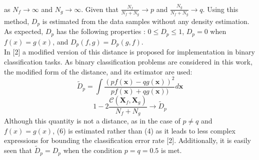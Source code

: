 \documentclass{article}
\begin{document}
	as $N_f \rightarrow \infty$ and $N_g \rightarrow \infty$. Given that $\frac{N_f}{N_f+N_g} \rightarrow p$ and $\frac{N_g}{N_f+N_g} \rightarrow q$. Using this method, $D_p$ is estimated from the data samples without any density estimation. As expected, $D_p$ has the following properties : $0 \leq D_p \leq 1$, $D_p=0$ when $f(x)=g(x)$, and $D_p(f,g)=D_p(g,f)$. 
	\\[0.5ex]
	\indent In [2] a modified version of this distance is proposed for implementation in binary classification tasks. As binary classification problems are considered in this work, the modified form of the distance, and its estimator are used:
	\begin{equation}
		\widetilde{D}_p=\int \frac{(pf(\textbf{x})-qg(\textbf{x}))^2}{pf(\textbf{x})+qg(\textbf{x}))}d\textbf{x}
	\end{equation}
	\begin{equation}
	1 - 2 \frac{\mathcal{C}(\textbf{X}_f,\textbf{X}_g)}{N_f + N_g} \rightarrow \widetilde{D}_p
	\end{equation}
	Although this quantity is not a distance, as in the case of $p\neq q$ and $f(x)=g(x)$, (6) is estimated rather than (4) as it leads to less complex expressions for bounding the classification error rate [2]. Additionally, it is easily seen that $\widetilde{D}_p=D_p$ when the condition $p=q=0.5$ is met.
\end{document}
